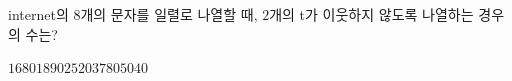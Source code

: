 internet의 $8$개의 문자를 일렬로 나열할 때, $2$개의 t가 이웃하지 않도록 나열하는 경우의 수는?
\begin{choices32}{$1680$}{$1890$}{$2520$}{$3780$}{$5040$}\end{choices32}
